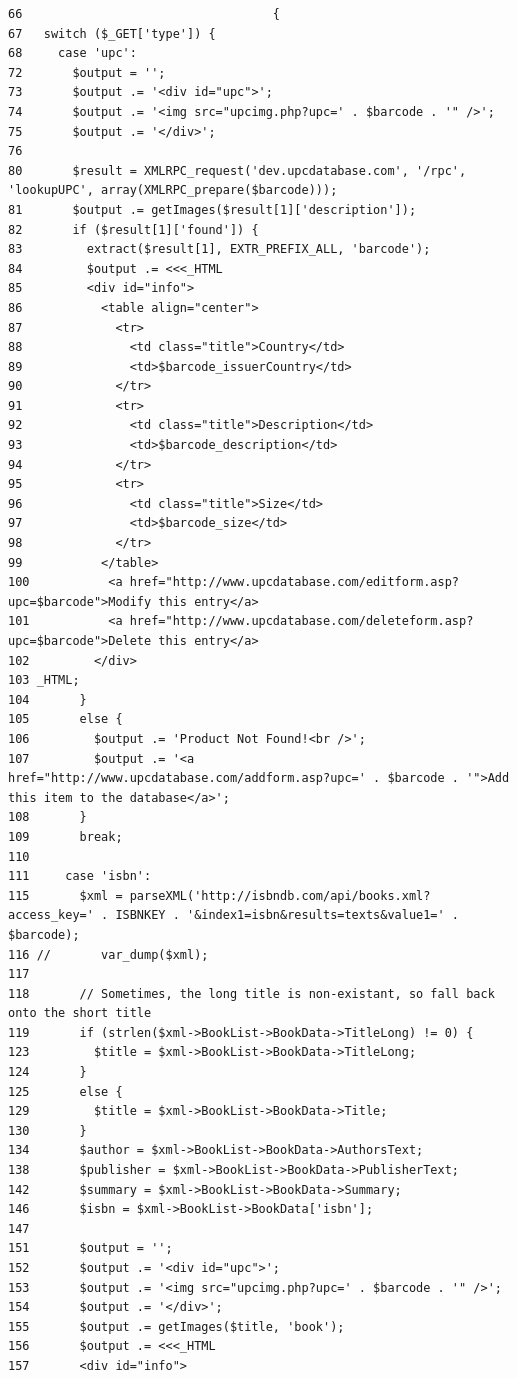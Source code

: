 \begin{Code}\begin{verbatim}66                                   {
67   switch ($_GET['type']) {
68     case 'upc':
72       $output = '';
73       $output .= '<div id="upc">';
74       $output .= '<img src="upcimg.php?upc=' . $barcode . '" />';
75       $output .= '</div>';
76 
80       $result = XMLRPC_request('dev.upcdatabase.com', '/rpc', 'lookupUPC', array(XMLRPC_prepare($barcode)));
81       $output .= getImages($result[1]['description']);
82       if ($result[1]['found']) {
83         extract($result[1], EXTR_PREFIX_ALL, 'barcode');
84         $output .= <<<_HTML
85         <div id="info">
86           <table align="center">
87             <tr>
88               <td class="title">Country</td>
89               <td>$barcode_issuerCountry</td>
90             </tr>
91             <tr>
92               <td class="title">Description</td>
93               <td>$barcode_description</td>
94             </tr>
95             <tr>
96               <td class="title">Size</td>
97               <td>$barcode_size</td>
98             </tr>
99           </table>
100           <a href="http://www.upcdatabase.com/editform.asp?upc=$barcode">Modify this entry</a>
101           <a href="http://www.upcdatabase.com/deleteform.asp?upc=$barcode">Delete this entry</a>
102         </div>
103 _HTML;
104       }
105       else {
106         $output .= 'Product Not Found!<br />';
107         $output .= '<a href="http://www.upcdatabase.com/addform.asp?upc=' . $barcode . '">Add this item to the database</a>';
108       }
109       break;
110 
111     case 'isbn':
115       $xml = parseXML('http://isbndb.com/api/books.xml?access_key=' . ISBNKEY . '&index1=isbn&results=texts&value1=' . $barcode);
116 //       var_dump($xml);
117 
118       // Sometimes, the long title is non-existant, so fall back onto the short title
119       if (strlen($xml->BookList->BookData->TitleLong) != 0) {
123         $title = $xml->BookList->BookData->TitleLong;
124       }
125       else {
129         $title = $xml->BookList->BookData->Title;
130       }
134       $author = $xml->BookList->BookData->AuthorsText;
138       $publisher = $xml->BookList->BookData->PublisherText;
142       $summary = $xml->BookList->BookData->Summary;
146       $isbn = $xml->BookList->BookData['isbn'];
147 
151       $output = '';
152       $output .= '<div id="upc">';
153       $output .= '<img src="upcimg.php?upc=' . $barcode . '" />';
154       $output .= '</div>';
155       $output .= getImages($title, 'book');
156       $output .= <<<_HTML
157       <div id="info">

\end{verbatim}
\end{Code}
